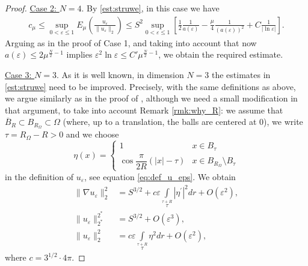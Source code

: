 \documentclass[10pt]{article}
\newcommand{\eps}{\varepsilon}
\theoremstyle{definition}
\numberwithin{equation}{section}
\begin{document}
\begin{proof}
\underline{Case 2: $N=4$}. By \eqref{est:struwe}, in this case we have
\begin{equation*}
    \begin{aligned}\displaystyle
 c_{\mu}\leq \sup\limits_{0<\varepsilon\le 1}E_{\mu}\left(\frac{u_{\varepsilon}}{\|u_{\varepsilon}\|_{2}}\right)\leq S^{2} \sup\limits_{0<\varepsilon\le 1}\left[\frac{1}{2}\frac{1}{a(\varepsilon)}-\frac{\mu}{4}\frac{1}{(a(\varepsilon))^{2}}+C\frac{1}{|\ln \varepsilon|}\right].
    \end{aligned}
\end{equation*}
Arguing as in the proof of Case 1, and taking into account that now $a(\eps)\le 2\mu^{\frac{N}{2}-1}$
implies $\eps^2 \ln \eps \le C' \mu^{\frac{N}{2}-1}$, we obtain the required estimate.

\underline{Case 3: $N=3$}.
As it is well known, in dimension $N=3$ the estimates in \eqref{est:struwe} need to be improved.
Precisely, with the same definitions as above, we argue similarly as in the proof of
\cite[eqs. (1.27)-(1.29)]{BrezisNirenberg}, although we need a small modification in that argument, 
to take into account Remark \ref{rmk:why_R}: we assume that $\overline{B}_R\subset B_{R_\Omega} 
\subset \Omega$ (where, up to a translation, the balls are centered at $0$), 
we write $\tau=R_\Omega-R>0$ and we choose
\[
\eta(x)=
\begin{cases}
1  &  x \in B_\tau\\
\cos\dfrac{\pi}{2R}\left( |x| - \tau\right)   &  x \in B_{R_\Omega}\setminus B_\tau
\end{cases}
\] 
in the definition of $u_\eps$, see equation \eqref{eq:def_u_eps}.
We obtain
\begin{equation*}
    \begin{aligned}\displaystyle
\|\nabla u_{\varepsilon}\|_{2}^{2}&=S^{3/2}+ c \varepsilon \int\limits_{\tau}\limits^{\tau+R}|\eta^{\prime}|^{2}dr +O(\varepsilon^{2}),\\
\|u_{\varepsilon}\|_{2^{*}}^{2^{*}}&=S^{3/2}+O(\varepsilon^{3}),\\
\|u_{\varepsilon}\|_{2}^{2}&=c\varepsilon \int\limits_{\tau}\limits^{\tau+R}\eta^{2}dr+O(\varepsilon^{2}),
    \end{aligned}
\end{equation*}
where $c= 3^{1/2}\cdot 4\pi$.


\end{proof}
\end{document}
